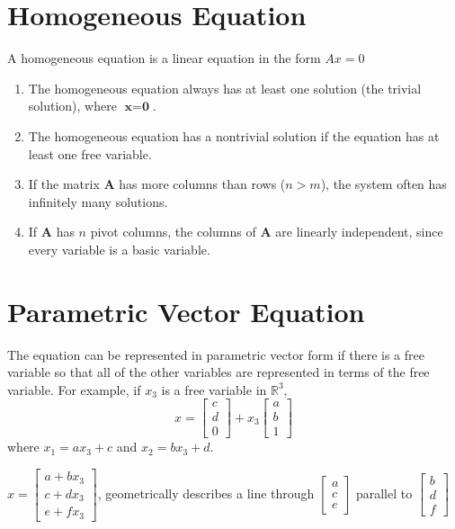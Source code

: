 \documentclass{article}
\begin{document}
\section*{Homogeneous Equation}
A homogeneous equation is a linear equation in the form $Ax=0$

\begin{enumerate}
    \item The homogeneous equation always has at least one solution (the trivial solution), where
    $\textbf{x}=\textbf{0}$.
    \item The homogeneous equation has a nontrivial solution if the equation has at least one free
    variable.
    \item If the matrix $\textbf{A}$ has more columns than rows ($n > m$), the system often has
    infinitely many solutions.
    \item If $\textbf{A}$ has $n$ pivot columns, the columns of $\textbf{A}$ are linearly
    independent, since every variable is a basic variable.
\end{enumerate}

\section*{Parametric Vector Equation}
The equation can be represented in parametric vector form if there is a free variable so that all
of the other variables are represented in terms of the free variable. For example, if $x_3$ is a
free variable in $\mathbb{R}^3$, 
\[x=\begin{bmatrix} c \\ d \\ 0 \end{bmatrix} + x_3
\begin{bmatrix} a \\ b \\ 1\end{bmatrix}\] 
where $x_1=ax_3 + c$ and $x_2=bx_3 + d$.\newline

$x = \begin{bmatrix}
    a + bx_3 \\ c + dx_3 \\ e + fx_3
\end{bmatrix}$, geometrically describes a line through $\begin{bmatrix}
    a \\ c \\ e
\end{bmatrix}$ parallel to $\begin{bmatrix}
    b \\ d \\ f
\end{bmatrix}$\newline
\end{document}
